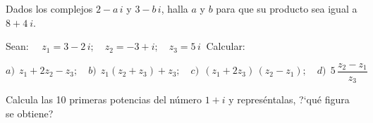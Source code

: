 \vspace{-8mm}
\begin{flushright}
\begin{footnotesize} \textcolor{gris}{}	\end{footnotesize}
\end{flushright}


\begin{mipropuesto}

Dados los complejos $2-a\, i$ y $3-b\, i$, halla $a$ y $b$ para que su producto sea igual a $8+4\ i$.
\end{mipropuesto}

\vspace{-8mm}
\begin{flushright}
\begin{footnotesize} \textcolor{gris}{}	\end{footnotesize}
\end{flushright}


\begin{mipropuesto}

Sean: $\quad z_1=3-2\, i;\quad z_2=-3+i;\quad z_3=5\, i \ $ Calcular:

$a)\ \ z_1+2z_2-z_3;\quad b)\ \ z_1(z_2+z_3)+z_3;\quad c) \ \ (z_1+2z_3)\, (z_2-z_1);\quad d)\ \ 5\,\dfrac{z_2-z_1}{z_3}$	
\end{mipropuesto}

\vspace{-8mm}
\begin{flushright}
\begin{footnotesize} \textcolor{gris}{}	\end{footnotesize}
\end{flushright}


\begin{mipropuesto}

Calcula las 10 primeras potencias del número $1+i$ y represéntalas, ?`qué figura se obtiene?	
\end{mipropuesto}

\vspace{-8mm}
\begin{flushright}
\begin{footnotesize} \textcolor{gris}{}	\end{footnotesize}
\end{flushright}

